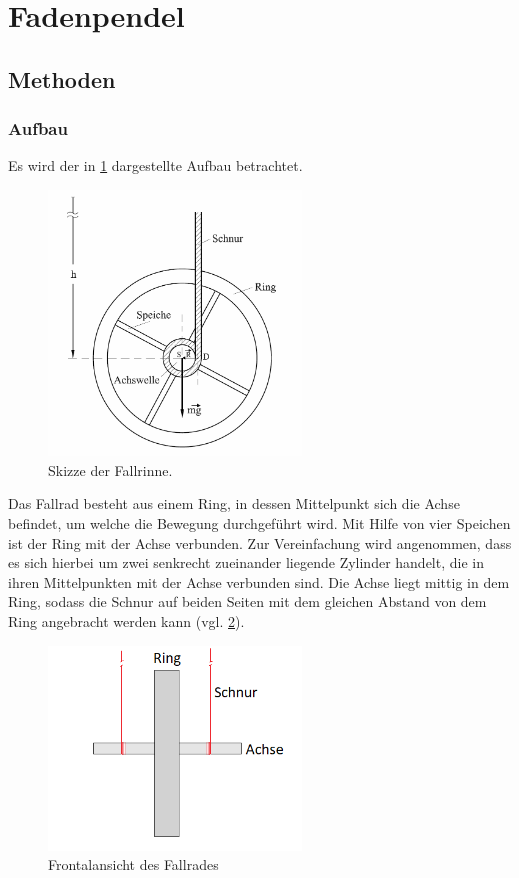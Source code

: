 \section{Fadenpendel} %
	
	\subsection{Methoden}
		
		\subsubsection{Aufbau}
			
			Es wird der in \ref{fig:FallradSkizze} dargestellte Aufbau betrachtet. 
			\begin{figure}[ht]
				\centering
				\includegraphics[width=0.6\textwidth]{fallrad_skizze.png}
				\caption{Skizze der Fallrinne.}
				\label{fig:FallradSkizze}	
			\end{figure}
			Das Fallrad besteht aus einem Ring, in dessen Mittelpunkt sich die Achse befindet, um welche die Bewegung durchgeführt wird. Mit Hilfe von vier Speichen ist der Ring mit der Achse verbunden. Zur Vereinfachung wird angenommen, dass es sich hierbei um zwei senkrecht zueinander liegende Zylinder handelt, die in ihren Mittelpunkten mit der Achse verbunden sind. 
			Die Achse liegt mittig in dem Ring, sodass die Schnur auf beiden Seiten mit dem gleichen Abstand von dem Ring angebracht werden kann (vgl. \ref{fig:FallradFrontal}). 
			\begin{figure}[ht]
				\centering
				\includegraphics[width=0.6\textwidth]{fallrad_frontal.png}
				\caption{Frontalansicht des Fallrades}
				\label{fig:FallradFrontal}	
			\end{figure}
